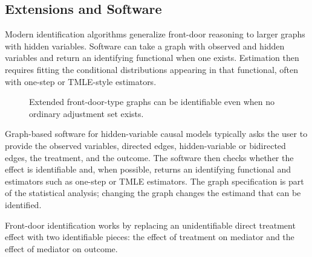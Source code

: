 \subsection{Extensions and Software}

Modern identification algorithms generalize front-door reasoning to larger
graphs with hidden variables. Software can take a graph with observed and hidden
variables and return an identifying functional when one exists. Estimation then
requires fitting the conditional distributions appearing in that functional,
often with one-step or TMLE-style estimators.

\begin{figure}[H]
\centering
{}
\caption{Extended front-door-type graphs can be identifiable even when no ordinary adjustment set exists.}
\label{fig:ch9-extended-frontdoor}
\end{figure}

\begin{implementationbox}
Graph-based software for hidden-variable causal models typically asks the user
to provide the observed variables, directed edges, hidden-variable or bidirected
edges, the treatment, and the outcome. The software then checks whether the
effect is identifiable and, when possible, returns an identifying functional and
estimators such as one-step or TMLE estimators. The graph specification is part
of the statistical analysis; changing the graph changes the estimand that can be
identified.
\end{implementationbox}

\begin{keyidea}
Front-door identification works by replacing an unidentifiable direct treatment
effect with two identifiable pieces: the effect of treatment on mediator and the
effect of mediator on outcome.
\end{keyidea}
